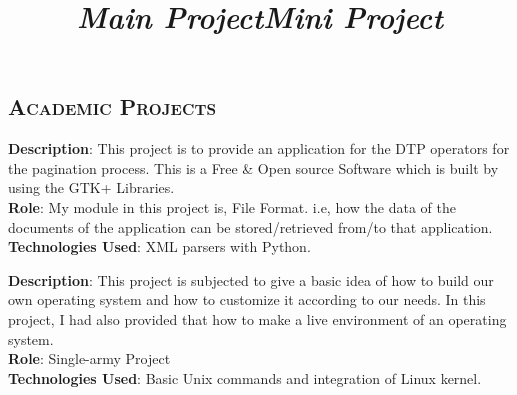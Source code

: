 \begin{resume}
\section{\textsc{Academic Projects}}
\title{\em \textbf{Main Project}}
\begin{position}
\textbf{Description}: This project is to provide an application for
the DTP operators for the pagination process. This is a Free \& Open
source Software which is built by using the GTK+ Libraries.\\
\textbf{Role}: My module in this project is, File Format. i.e, how the
data of the documents of the application can be stored/retrieved
from/to that application.\\
\textbf{Technologies Used}: XML parsers with Python.\\
\end{position}
\title{\em \textbf{Mini Project}}
\begin{position}
\textbf{Description}: This project is subjected to give a basic idea
of how to build our own operating system and how  to  customize it
according to our needs. In this project, I had also provided that how
to make a live environment of an operating system.\\
\textbf{Role}: Single-army Project\\
\textbf{Technologies Used}: Basic Unix commands and integration of
Linux kernel.\\
\end{position}




\begin{formatb}
  \\
  \body\\
\end{formatb}


\end{resume}
